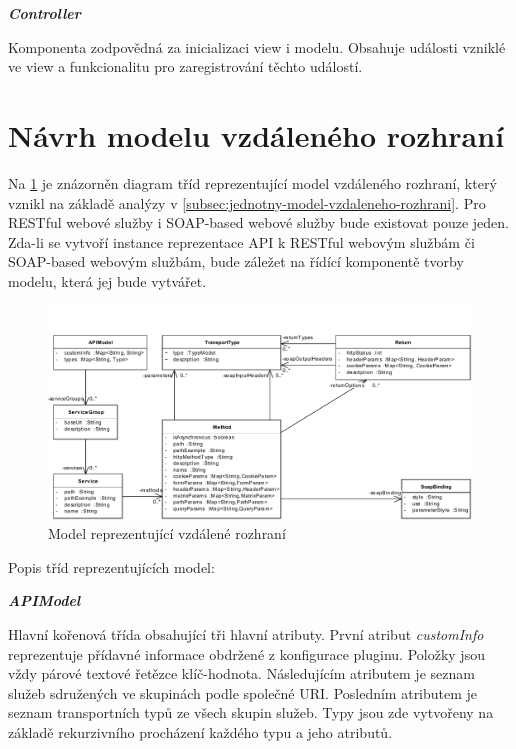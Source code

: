 \documentclass[11pt,twoside,a4paper]{book}
\begin{document}
\textbf{\textit{Controller}}

Komponenta zodpovědná za inicializaci view i modelu. Obsahuje události vzniklé ve view a
funkcionalitu pro zaregistrování těchto událostí.

\section{Návrh modelu vzdáleného rozhraní}

Na \ref{fig:navrh-modelu} je znázorněn diagram tříd reprezentující model
vzdáleného rozhraní, který vznikl na základě analýzy v
\ref{subsec:jednotny-model-vzdaleneho-rozhrani}. Pro RESTful webové služby i
SOAP-based webové služby bude existovat pouze jeden. Zda-li se vytvoří instance
reprezentace API k RESTful webovým službám či SOAP-based webovým službám, bude
záležet na řídící komponentě tvorby modelu, která jej bude vytvářet.

\begin{figure}[h]
\begin{center}
\includegraphics[width=13cm]{images-pdf/UniversalModel.pdf}
\caption{Model reprezentující vzdálené rozhraní}
\label{fig:navrh-modelu}
\end{center}
\end{figure}

Popis tříd reprezentujících model:

\textbf{\textit{APIModel}}

Hlavní kořenová třída obsahující tři hlavní atributy. První atribut {\em
customInfo} reprezentuje přídavné informace obdržené z konfigurace pluginu.
Položky jsou vždy párové textové řetězce klíč-hodnota. Následujícím atributem je
seznam služeb sdružených ve skupinách podle společné URI. Posledním atributem je
seznam transportních typů ze všech skupin služeb. Typy jsou zde vytvořeny na
základě rekurzivního procházení každého typu a jeho atributů.
\end{document}
